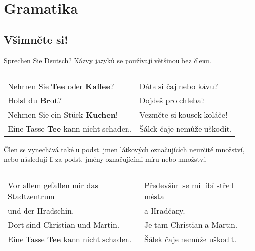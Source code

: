   \section*{Gramatika}
    \subsection*{Všimněte si!} %
      \hspace*{2em}Sprechen Sie Deutsch?\newline
      Názvy jazyků se používají většinou bez členu.
        \vspace*{-1em}
      \begin{table}[ht!]
        \hspace*{1em}
        \begin{tabular}{ll}  %
           Nehmen Sie \textbf{Tee} oder \textbf{Kaffee}? & Dáte si čaj nebo kávu?      \\
           Holst du \textbf{Brot}?                       & Dojdeš pro chleba?          \\
           Nehmen Sie ein Stück \textbf{Kuchen}!         & Vezměte si kousek koláče!   \\
           Eine Tasse \textbf{Tee} kann nicht schaden.   & Šálek čaje nemůže uškodit.  \\
        \end{tabular}
        \caption*{ }
      \end{table}

      Člen se vynechává také u podst. jmen látkových označujících neurčité množství, nebo následují-li za 
      podst. jmény označujícími míru nebo množství.
      \begin{table}[ht!]
        \hspace*{1em}
        \begin{tabular}{ll}  %
           Vor allem gefallen mir das Stadtzentrum  & Především se mi líbí střed města     \\
           \hspace*{3em}und der Hradschin.          & \hspace*{3em}a Hradčany.             \\
           Dort sind Christian und Martin.          & Je tam Christian a Martin.           \\
           Eine Tasse \textbf{Tee} kann nicht schaden.   & Šálek čaje nemůže uškodit.  \\
        \end{tabular}
        \caption*{ }
      \end{table}
      
